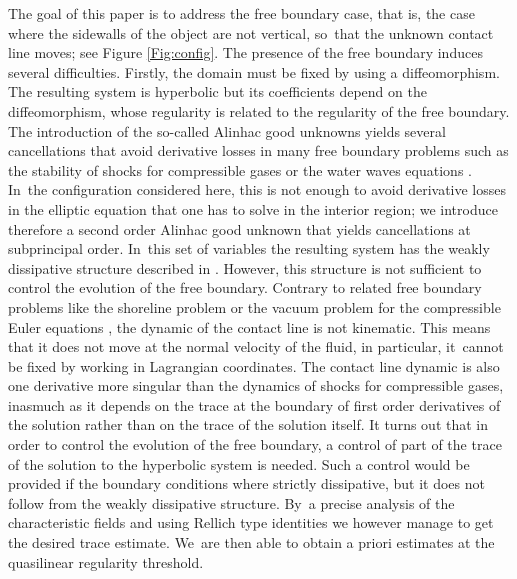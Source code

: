 \documentclass[JEP,XML,SOM,Unicode,NoFloatCountersInSection,published]{cedram}
\theoremstyle{definition}
\begin{document}
The goal of this paper is to address the free boundary case, that is,
the case where the sidewalls of the object are not vertical, so~that the unknown contact line moves; see Figure \ref{Fig:config}.
The presence of the free boundary induces several difficulties.
Firstly, the domain must be fixed by using a diffeomorphism.
The resulting system is hyperbolic but its coefficients depend on the diffeomorphism, whose regularity is related to the regularity of the free boundary.
The introduction of the so-called Alinhac good unknowns \cite{Alinhac} yields several cancellations that avoid derivative losses in many free boundary problems
such as the stability of shocks for compressible gases \cite{Majda,Metivier} or the water waves equations \cite{Lannes2005,Iguchi,AlazardMetivier}. In~the configuration considered here, this is not enough to avoid derivative losses in the elliptic equation that one has to solve in the interior region;
we introduce therefore a second order Alinhac good unknown that yields cancellations at subprincipal order. In~this set of variables the resulting system has the weakly dissipative structure described in \cite{IguchiLannes2023}.
However, this structure is not sufficient to control the evolution of the free boundary.
Contrary to related free boundary problems like the shoreline problem \cite{LannesMetivier,Poyferre,MingWang} or
the vacuum problem for the compressible Euler equations \cite{CoutandShkoller,JangMasmoudi,IfrimTataru}, the dynamic of the contact line is not kinematic.
This means that it does not move at the normal velocity of the fluid, in particular, it~cannot be fixed by working in Lagrangian coordinates.
The contact line dynamic is also one derivative more singular than the dynamics of shocks for compressible gases,
inasmuch as it depends on the trace at the boundary of first order derivatives of the solution rather than on the trace of the solution itself.
It turns out that in order to control the evolution of the free boundary, a control of part of the trace of the solution to the hyperbolic system is needed.
Such a control would be provided if the boundary conditions where strictly dissipative, but it does not follow from the weakly dissipative structure. By~a precise analysis of the characteristic fields and using Rellich type identities we however manage to get the desired trace estimate. We~are then able to obtain a priori estimates at the quasilinear regularity threshold.
\end{document}

